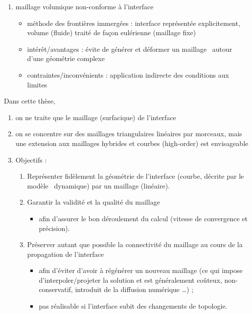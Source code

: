 \begin{enumerate}
	\item maillage volumique non-conforme à l’interface
	\begin{itemize}
		\item méthode des frontières immergées \cite{peskin2002, hovnanian2012, wang2012} : interface représentée explicitement, volume (fluide) traité de façon eulérienne (\ie maillage fixe)
		\item intérêt/avantages : évite de générer et déformer un maillage \troisD\ autour d’une géométrie complexe
		\item contraintes/inconvénients : application indirecte des conditions aux limites
	\end{itemize}
\end{enumerate}

Dans cette thèse,
\begin{enumerate}
	\item on ne traite que le maillage (surfacique) de l'interface
	\item on se concentre sur des maillages triangulaires linéaires par morceaux, mais une extension aux maillages hybrides et courbes (high-order) est envisageable
	\item Objectifs :
	\begin{enumerate}
		\item\label{obj:maillage_geometriquement_fidele} Représenter fidèlement la géométrie de l'interface (courbe, décrite par le modèle \brep\ dynamique) par un maillage (linéaire).
		
		\item\label{obj:validite_qualite_maillage} Garantir la validité et la qualité du maillage
		\begin{itemize}
			\item afin d'assurer le bon déroulement du calcul (vitesse de convergence et précision).
		\end{itemize}
		
		\item\label{obj:preserver_connectivite_maillage} Préserver autant que possible la connectivité du maillage au cours de la propagation de l'interface
		\begin{itemize}
			\item afin d'éviter d'avoir à régénérer un nouveau maillage (ce qui impose d'interpoler/projeter la solution et est généralement coûteux, non-conservatif, introduit de la diffusion numérique \ldots) ;
			\item pas réalisable si l'interface subit des changements de topologie.
		\end{itemize}
		
	\end{enumerate}
\end{enumerate}





